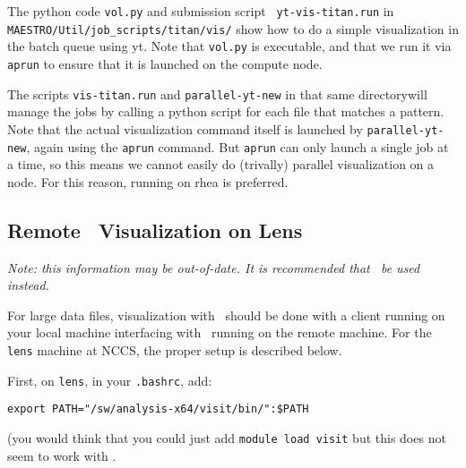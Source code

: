 The python code {\tt vol.py} and submission script {\tt
  yt-vis-titan.run} in {\tt MAESTRO/Util/job\_scripts/titan/vis/} show
how to do a simple visualization in the batch queue using yt.  Note
that {\tt vol.py} is executable, and that we run it via {\tt aprun} to
ensure that it is launched on the compute node.

The scripts {\tt vis-titan.run} and {\tt parallel-yt-new} in that
same directorywill manage the \yt jobs by calling a
python script for each file that matches a pattern.  
Note that the actual visualization command itself is launched by
{\tt parallel-yt-new}, again using the {\tt aprun} command.  But
{\tt aprun} can only launch a single job at a time, so this means
we cannot easily do (trivally) parallel visualization on a node.  For
this reason, running on rhea is preferred.


\subsection{Remote \visit\ Visualization on Lens}

{\em Note: this information may be out-of-date.  It is recommended that
 \yt\ be used instead.}

For large data files, visualization with \visit\ should be done with
a client running on your local machine interfacing with \visit\ running
on the remote machine.  For the {\tt lens} machine at NCCS, the proper setup
is described below.

First, on {\tt lens}, in your {\tt .bashrc}, add:
\begin{verbatim}
export PATH="/sw/analysis-x64/visit/bin/":$PATH
\end{verbatim}
(you would think that you could just add {\tt module load visit} but this
does not seem to work with \visit.

